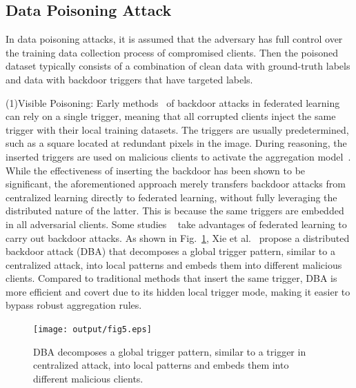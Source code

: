 \documentclass[pdflatex,sn-mathphys-num]{sn-jnl}%
\theoremstyle{thmstyleone}%
\theoremstyle{thmstyletwo}%
\theoremstyle{thmstylethree}%
\begin{document}
\subsection{Data Poisoning Attack}
In data poisoning attacks, it is assumed that the
adversary has full control over the training data collection
process of compromised clients. Then the poisoned dataset
typically consists of a combination of clean data with
ground-truth labels and data with backdoor triggers that
have targeted labels.

(1)Visible Poisoning: Early methods~\cite{bagdasaryan2020backdoor,gong2022backdoor} of backdoor
attacks in federated learning can rely on a single trigger,
meaning that all corrupted clients inject the same trigger
with their local training datasets. The triggers are usually predetermined, such as a
square located at redundant pixels in the image. During
reasoning, the inserted triggers are used on malicious
clients to activate the aggregation model~\cite{bagdasaryan2020backdoor,gong2022backdoor}. While
the effectiveness of inserting the backdoor has been shown
to be significant, the aforementioned approach merely
transfers backdoor attacks from centralized learning
directly to federated learning, without fully leveraging the
distributed nature of the latter. This is because the same
triggers are embedded in all adversarial clients. Some
studies ~\cite{xie2019dba} take advantages of federated learning to carry out
backdoor attacks. As shown in Fig.~\ref{fig5}, Xie et al.~\cite{xie2019dba} propose
a distributed backdoor attack (DBA) that decomposes a
global trigger pattern, similar to a centralized attack, into
local patterns and embeds them into different malicious
clients. Compared to traditional methods that insert the
same trigger, DBA is more eﬀicient and covert due to
its hidden local trigger mode, making it easier to bypass
robust aggregation rules.

\begin{figure}[h]
	\centering
	\texttt{[image: output/fig5.eps]}
	\caption{DBA decomposes a global trigger pattern, similar to a
		trigger in centralized attack, into local patterns and embeds them
		into different malicious clients.}
	\label{fig5}
\end{figure}
\end{document}
